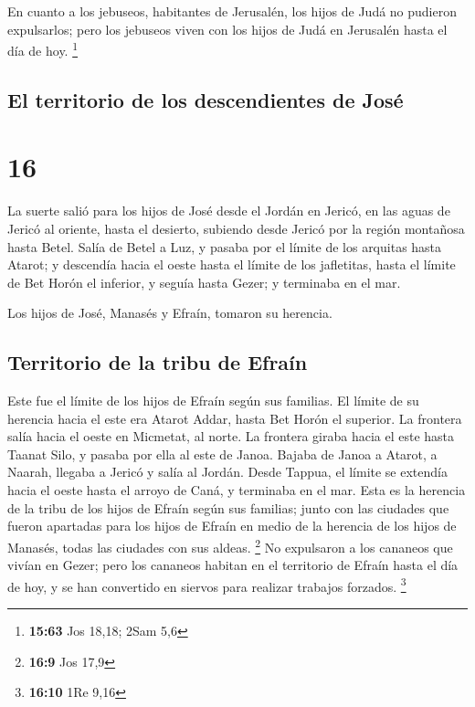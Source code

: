 En cuanto a los jebuseos, habitantes de Jerusalén, los
hijos de Judá no pudieron expulsarlos; pero los jebuseos viven con los
hijos de Judá en Jerusalén hasta el día de hoy. \footnote{\textbf{15:63}
  Jos 18,18; 2Sam 5,6}

\hypertarget{el-territorio-de-los-descendientes-de-josuxe9}{%
\subsection{El territorio de los descendientes de
José}\label{el-territorio-de-los-descendientes-de-josuxe9}}

\hypertarget{section-15}{%
\section{16}\label{section-15}}

 La suerte salió para los hijos de José desde el Jordán en
Jericó, en las aguas de Jericó al oriente, hasta el desierto, subiendo
desde Jericó por la región montañosa hasta Betel.  Salía
de Betel a Luz, y pasaba por el límite de los arquitas hasta Atarot;
 y descendía hacia el oeste hasta el límite de los
jafletitas, hasta el límite de Bet Horón el inferior, y seguía hasta
Gezer; y terminaba en el mar.

 Los hijos de José, Manasés y Efraín, tomaron su herencia.

\hypertarget{territorio-de-la-tribu-de-efrauxedn}{%
\subsection{Territorio de la tribu de
Efraín}\label{territorio-de-la-tribu-de-efrauxedn}}

 Este fue el límite de los hijos de Efraín según sus
familias. El límite de su herencia hacia el este era Atarot Addar, hasta
Bet Horón el superior.  La frontera salía hacia el oeste
en Micmetat, al norte. La frontera giraba hacia el este hasta Taanat
Silo, y pasaba por ella al este de Janoa.  Bajaba de Janoa
a Atarot, a Naarah, llegaba a Jericó y salía al Jordán. 
Desde Tappua, el límite se extendía hacia el oeste hasta el arroyo de
Caná, y terminaba en el mar. Esta es la herencia de la tribu de los
hijos de Efraín según sus familias;  junto con las
ciudades que fueron apartadas para los hijos de Efraín en medio de la
herencia de los hijos de Manasés, todas las ciudades con sus aldeas.
\footnote{\textbf{16:9} Jos 17,9}  No expulsaron a los
cananeos que vivían en Gezer; pero los cananeos habitan en el territorio
de Efraín hasta el día de hoy, y se han convertido en siervos para
realizar trabajos forzados. \footnote{\textbf{16:10} 1Re 9,16}

